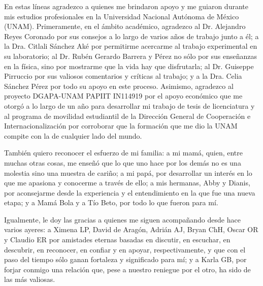 \begin{acknowledgements}
\small
\vspace*{2.5em}

En estas líneas agradezco a quienes me brindaron apoyo y me guiaron durante mis estudios profesionales en la Universidad Nacional Autónoma de México (UNAM). Primeramente, en el ámbito académico, agradezco al Dr. Alejandro Reyes Coronado por sus consejos a lo largo de varios años de trabajo junto a él; a la Dra. Citlali Sánchez Aké por permitirme acercarme al trabajo experimental en su laboratorio; al Dr. Rubén Gerardo Barrera y Pérez no sólo por sus enseñanzas en la física, sino por mostrarme que la vida hay que disfrutarla;  al Dr. Guiseppe Pirruccio por sus valiosos comentarios y críticas al trabajo; y a la Dra. Celia Sánchez Pérez por todo su apoyo en este proceso. Asimismo, agradezco al proyecto  DGAPA-UNAM PAPIIT IN114919 por el apoyo económico que me otorgó a lo largo de un año para desarrollar mi trabajo de tesis de licenciatura y al programa de movilidad estudiantil de la Dirección General de Cooperación e Internacionalización por corroborar que la formación que me dio la UNAM compite con la de cualquier lado del mundo.

También quiero reconocer el esfuerzo de mi familia: a mi mamá, quien, entre muchas otras cosas, me enseñó que lo que uno hace por los demás no es una molestia sino una muestra de cariño; a mi papá, por desarrollar un interés en lo que me apasiona y conocerme a través de ello; a mis hermanas, Abby y Dianis, por aconsejarme desde la experiencia y el entendimiento en la que fue una nueva etapa; y a Mamá Bola y a Tío Beto, por todo lo que fueron para mí.

Igualmente, le doy las gracias a quienes me siguen acompañando desde hace varios ayeres: a Ximena LP, David de Aragón, Adrián AJ, Bryan ChH, Oscar OR y Claudio ER por amistades eternas basadas en discutir, en escuchar, en descubrir, en reconocer, en confiar y en apoyar, respectivamente, y que con el paso del tiempo sólo ganan fortaleza y significado para mí; y a Karla GB, por forjar conmigo una relación que, pese a nuestro reniegue por el otro, ha sido de las más valiosas.


\end{acknowledgements}
